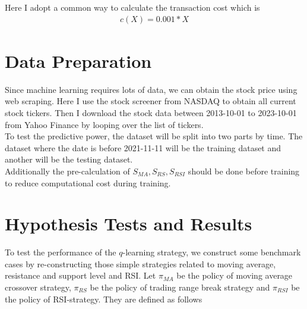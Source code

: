 \documentclass[11pt,a4paper]{article}
\numberwithin{equation}{section}
\begin{document}
Here I adopt a common way to calculate the transaction cost which is
\begin{align}
  c(X) = 0.001 * X
\end{align}

\section{Data Preparation}

Since machine learning requires lots of data, we can obtain the stock price using web scraping. Here I use the stock screener from NASDAQ to obtain all current stock tickers. Then I download the stock data between 2013-10-01 to 2023-10-01 from Yahoo Finance by looping over the list of tickers. \\

To test the predictive power, the dataset will be split into two parts by time. The dataset where the date is before 2021-11-11 will be the training dataset and another will be the testing dataset. \\

Additionally the pre-calculation of $S_{MA}, S_{RS}, S_{RSI}$ should be done before training to reduce computational cost during training.

\section{Hypothesis Tests and Results}

To test the performance of the $q$-learning strategy, we construct some benchmark cases by re-constructing those simple strategies related to moving average, resistance and support level and RSI. Let $\pi_{MA}$ be the policy of moving average crossover strategy, $\pi_{RS}$ be the policy of trading range break strategy and $\pi_{RSI}$ be the policy of RSI-strategy. They are defined as follows
\end{document}
